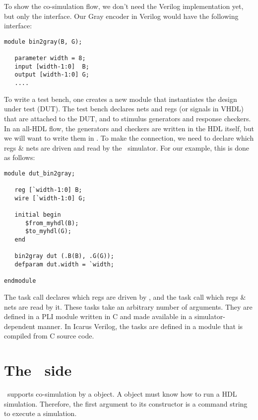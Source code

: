 To show the co-simulation flow, we don't need the Verilog
implementation yet, but only the interface.  Our Gray encoder in
Verilog would have the following interface:

\begin{verbatim}
module bin2gray(B, G);

   parameter width = 8;
   input [width-1:0]  B;     
   output [width-1:0] G;
   ....

\end{verbatim}

To write a test bench, one creates a new module that instantiates the
design under test (DUT).  The test bench declares nets and
regs (or signals in VHDL) that are attached to the DUT, and to
stimulus generators and response checkers. In an all-HDL flow, the
generators and checkers are written in the HDL itself, but we will
want to write them in \myhdl{}. To make the connection, we need to
declare which regs \& nets are driven and read by the \myhdl\
simulator. For our example, this is done as follows:

\begin{verbatim}
module dut_bin2gray;

   reg [`width-1:0] B;
   wire [`width-1:0] G;

   initial begin
      $from_myhdl(B);
      $to_myhdl(G);
   end

   bin2gray dut (.B(B), .G(G));
   defparam dut.width = `width;

endmodule

\end{verbatim}

The  task call declares which regs are driven by
\myhdl{}, and the \code{\$to_myhdl} task call which regs \& nets are read
by it. These tasks take an arbitrary number of arguments.  They are
defined in a PLI module written in C and made available in a
simulator-dependent manner.  In Icarus Verilog, the tasks are defined
in a \code{myhdl.vpi} module that is compiled from C source code.

\section{The \myhdl\ side}

\myhdl\ supports co-simulation by a  object. 
A \code{Cosimulation} object must know how to run a HDL simulation.
Therefore, the first argument to its constructor is a command string
to execute a simulation.

